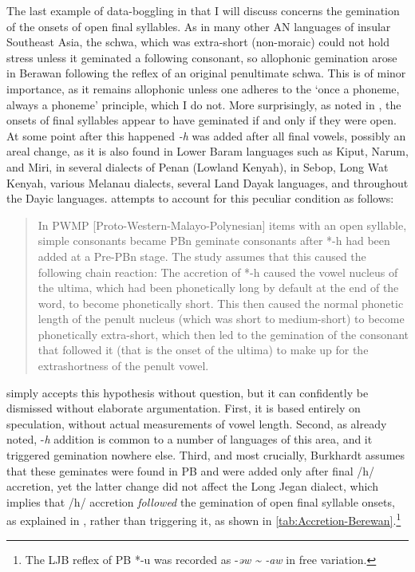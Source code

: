 \documentclass[output=paper]{langscibook}
\begin{document}
The last example of data-boggling in \citet{Beguš2018} that I will discuss concerns the gemination of the onsets of open final syllables. As in many other AN languages of insular Southeast Asia, the schwa, which was extra-short (non-moraic) could not hold stress unless it geminated a following consonant, so allophonic gemination arose in Berawan following the reflex of an original penultimate schwa. This is of minor importance, as it remains allophonic unless one adheres to the ‘once a phoneme, always a phoneme’ principle, which I do not. More surprisingly, as noted in \citet{Blust1992,Blust1995}, the onsets of final syllables appear to have geminated if and only if they were open. At some point after this happened \textit{-h} was added after all final vowels, possibly an areal change, as it is also found in Lower Baram languages such as Kiput, Narum, and Miri, in several dialects of Penan (Lowland Kenyah), in Sebop, Long Wat Kenyah, various Melanau dialects, several Land Dayak languages, and throughout the Dayic languages. \citet[260]{Burkhardt2014} attempts to account for this peculiar condition as follows:

\begin{quote}
In PWMP [Proto-Western-Malayo-Polynesian] items with an open syllable, simple consonants became PBn geminate consonants after *-h had been added at a Pre-PBn stage. The study assumes that this caused the following chain reaction: The accretion of *-h caused the vowel nucleus of the ultima, which had been phonetically long by default at the end of the word, to become phonetically short. This then caused the normal phonetic length of the penult nucleus (which was short to medium-short) to become phonetically extra-short, which then led to the gemination of the consonant that followed it (that is the onset of the ultima) to make up for the extrashortness of the penult vowel.
\end{quote}

\citet[124]{Beguš2018} simply accepts this hypothesis without question, but it can confidently be dismissed without elaborate argumentation. First, it is based entirely on speculation, without actual measurements of vowel length. Second, as already noted, -\textit{h} addition is common to a number of languages of this area, and it triggered gemination nowhere else. Third, and most crucially, Burkhardt assumes that these geminates were found in PB and were added only after final \mbox{/h/} accretion, yet the latter change did not affect the Long Jegan dialect, which implies that /h/ accretion \textit{followed} the gemination of open final syllable onsets, as explained in \citet{Blust1992}, rather than triggering it, as shown in \cref{tab:Accretion-Berewan}.\footnote{The LJB reflex of PB *-u was recorded as -\textit{əw {\textasciitilde} -aw} in free variation.}
\end{document}
